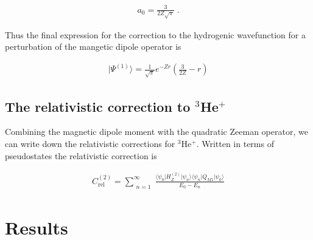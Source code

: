             \begin{align}
                a_0 = \frac{3}{2Z\sqrt{\pi}}\;.
            \end{align}

            Thus the final expression for the correction to the hydrogenic wavefunction for a perturbation of the mangetic dipole operator is 

            \begin{align}
                \vert \varPsi^{(1)} \rangle = \frac{1}{\sqrt{\pi}} e^{-Zr} \left( \frac{3}{2Z} - r\right)
            \end{align}

        \subsection{The relativistic correction to $^3$He$^+$}\label{sec:Relativistic_Correction}
            Combining the magnetic dipole moment with the quadratic Zeeman operator, we can write down the relativistic corrections for $^3$He$^+$. Written in terms of pseudostates the relativistic correction is

            \begin{align}
                C_{\text{rel}}^{(2)} =\sum_{\substack{n = 1}}^{\infty}
                \frac{\langle \psi_0 \vert H_Z^{(2)} \vert \psi_n \rangle \langle \psi_n \vert Q_{M1} \vert \psi_0 \rangle}{E_0 - E_n}
            \end{align}

    \section{Results}\label{sec:results}





